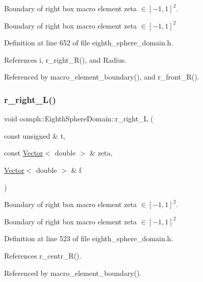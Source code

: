 Boundary of right box macro element zeta $ \in [-1,1]^2 $. 

Boundary of right box macro element zeta $ \in [-1,1]^2 $ 

Definition at line 652 of file eighth\+\_\+sphere\+\_\+domain.\+h.



References i, r\+\_\+right\+\_\+\+R(), and Radius.



Referenced by macro\+\_\+element\+\_\+boundary(), and r\+\_\+front\+\_\+\+R().

\mbox{\label{classoomph_1_1EighthSphereDomain_ad029a857dd1b83ed10281613e0c56800}} 
\subsubsection{\texorpdfstring{r\+\_\+right\+\_\+\+L()}{r\_right\_L()}}
{\footnotesize\ttfamily void oomph\+::\+Eighth\+Sphere\+Domain\+::r\+\_\+right\+\_\+L (\begin{DoxyParamCaption}\item[{const unsigned \&}]{t,  }\item[{const \hyperlink{classoomph_1_1Vector}{Vector}$<$ double $>$ \&}]{zeta,  }\item[{\hyperlink{classoomph_1_1Vector}{Vector}$<$ double $>$ \&}]{f }\end{DoxyParamCaption})\hspace{0.3cm}{\ttfamily [private]}}



Boundary of right box macro element zeta $ \in [-1,1]^2 $. 

Boundary of right box macro element zeta $ \in [-1,1]^2 $ 

Definition at line 523 of file eighth\+\_\+sphere\+\_\+domain.\+h.



References r\+\_\+centr\+\_\+\+R().



Referenced by macro\+\_\+element\+\_\+boundary().

\mbox{\label{classoomph_1_1EighthSphereDomain_a58ec95dc35f526fe5c6baa2578a2f786}} 
